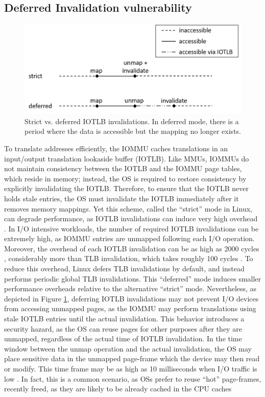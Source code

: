 \subsection{Deferred Invalidation vulnerability} 
\begin{figure}[t]
    \centering
    \includegraphics[width=1.3\columnwidth]{figs/deferred.png}
    \caption{Strict vs. deferred IOTLB invalidations. In deferred mode, there is a period
where the data is accessible but the mapping no longer exists.}
    \label{fig:deferred}
\end{figure}
To translate addresses efficiently, the IOMMU caches translations in an input/output translation lookaside buffer (IOTLB). Like MMUs, IOMMUs do not maintain consistency between the IOTLB and the IOMMU page tables, which reside in memory; instead, the OS is required to restore consistency by explicitly invalidating the IOTLB. Therefore, to ensure that the IOTLB never holds stale entries, the OS must invalidate the IOTLB immediately after it removes memory mappings. Yet this scheme, called the “strict” mode in Linux, can degrade performance, as IOTLB invalidations can induce very high overhead \cite{MMT16,MSMT18,Peleg15}. In I/O intensive workloads, the number of required IOTLB invalidations can be extremely high, as IOMMU entries are unmapped following each I/O operation. Moreover, the overhead of each IOTLB invalidation can be as high as 2000 cycles \cite{ABYTS11}, considerably more than TLB invalidation, which takes roughly 100 cycles \cite{Han14}. To reduce this overhead, Linux defers TLB invalidations by default, and instead performs periodic global TLB invalidations. This “deferred” mode induces smaller performance overheads relative to the alternative “strict” mode. Nevertheless, as depicted in Figure \ref{fig:deferred}, deferring IOTLB invalidations may not prevent I/O devices from accessing unmapped pages, as the IOMMU may perform translations using stale IOTLB entries until the actual invalidation. This behavior introduces a security hazard, as the OS can reuse pages for other purposes after they are unmapped, regardless of the actual time of IOTLB invalidation. In the time window between the unmap operation and the actual invalidation, the OS may place sensitive data in the unmapped page-frame which the device may then read or modify. This time frame may be as high as 10 milliseconds when I/O traffic is low \cite{MSMT18}. In fact, this is a common scenario, as OSs prefer to reuse “hot” page-frames, recently freed, as they are likely to be already cached in the CPU caches\cite{hotcold}
